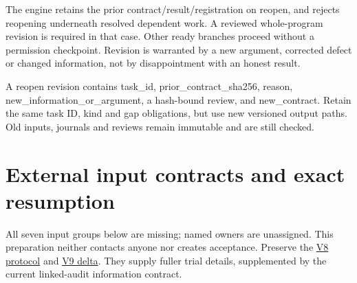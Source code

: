 \documentclass[
  11pt,
  a4paper,
]{article}
\begin{document}
The engine retains the prior contract/result/registration on reopen, and
rejects reopening underneath resolved dependent work. A reviewed
whole-program revision is required in that case. Other ready branches
proceed without a permission checkpoint. Revision is warranted by a new
argument, corrected defect or changed information, not by disappointment
with an honest result.

A reopen revision contains task\_id, prior\_contract\_sha256, reason,
new\_information\_or\_argument, a hash-bound review, and new\_contract.
Retain the same task ID, kind and gap obligations, but use new versioned
output paths. Old inputs, journals and reviews remain immutable and are
still checked.

\hypertarget{external-input-contracts-and-exact-resumption}{%
\section{External input contracts and exact
resumption}\label{external-input-contracts-and-exact-resumption}}

All seven input groups below are missing; named owners are unassigned.
This preparation neither contacts anyone nor creates acceptance.
Preserve the \href{external-validation-v8.md}{V8 protocol} and
\href{external-validation-v9.md}{V9 delta}. They supply fuller trial
details, supplemented by the current linked-audit information contract.
\end{document}
